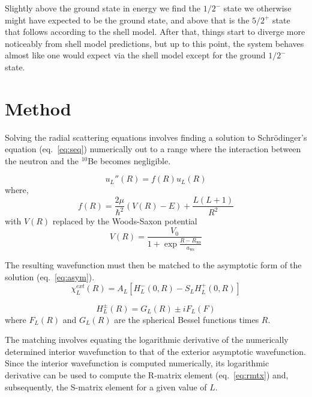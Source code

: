 \documentclass[]{scrartcl}
\begin{document}
Slightly above the ground state in energy we find the $1/2^-$ state we otherwise might have expected to be the ground state, and above that is the $5/2^+$ state that follows according to the shell model. After that, things start to diverge more noticeably from shell model predictions, but up to this point, the system behaves almost like one would expect via the shell model except for the ground $1/2^-$ state.

\section*{Method}\nonumber

Solving the radial scattering equations involves finding a solution to Schr\"{o}dinger's equation (eq.~\ref{eq:seq}) numerically out to a range where the interaction between the neutron and the $^{10}$Be becomes negligible.

\begin{equation}
	u_{L} '' (R) = f(R) u_{L} (R)
	\label{eq:seq}
\end{equation}
where,
\begin{equation}
	f(R) = \frac{2 \mu}{\hbar ^2} (V(R) - E) + \frac{L(L+1)}{R^2}
\end{equation}
with $V(R)$ replaced by the Woods-Saxon potential
\begin{equation}
	V(R) = \frac{ V_0 }{ 1 + \exp{ \frac{ R - R_{\mathrm{ws}} }{a_{\mathrm{ws}}}}}
	\label{eq:ws}
\end{equation}

\noindent The resulting wavefunction must then be matched to the asymptotic form of the solution (eq.~\ref{eq:asym}).
\begin{equation}
	\chi _L ^{ext} (R) = A _L [ H _L ^- (0,R) - S_L H_L ^+ (0,R) ]
	\label{eq:asym}
\end{equation}

\begin{equation}
	H_L ^{\pm} (R) = G_L (R) \pm i F_L (F)
\end{equation}
where $F_L (R)$ and $G_L (R)$ are the spherical Bessel functions times $R$.

The matching involves equating the logarithmic derivative of the numerically determined interior wavefunction to that of the exterior asymptotic wavefunction. Since the interior wavefunction is computed numerically, its logarithmic derivative can be used to compute the R-matrix element (eq.~\ref{eq:rmtx}) and, subsequently, the S-matrix element for a given value of $L$.
\end{document}
